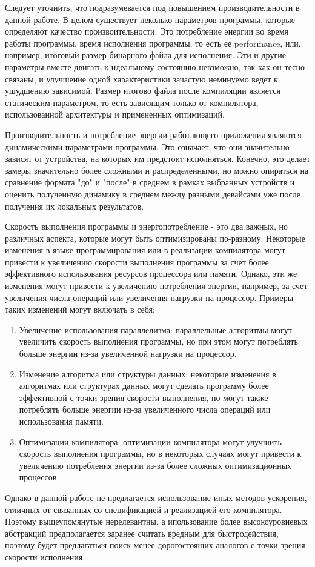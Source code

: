 \documentclass{mipt-thesis-bs}
\begin{document}
Следует уточнить, что подразумевается под повышением производительности в данной работе.
В целом существует неколько параметров программы, которые определяют качество произвоительности.
Это потребление энергии во время работы программы, время исполнения программы, то есть ее performance, или,
например, итоговый размер бинарного файла для исполнения.
Эти и другие параметры вместе двигать к идеальному состоянию невзможно, так как он тесно связаны, и
улучшение одной характеристики зачастую неминуемо ведет к ушудшению зависимой.
Размер итогово файла после компиляции является статическим параметром, то есть зависящим
только от компилятора, использованной архитектуры и примененных оптимизаций.

Производительность и потребление энергии работающего приложения являются динамическими
параметрами программы. Это означает, что они значительно зависят от устройства, на которых
им предстоит исполняться. Конечно, это делает замеры значительно более сложными и распределенными,
но можно опираться на сравнение формата "до" и "после" в среднем в рамках выбранных устройств и
оценить полученную динамику в среднем между разными девайсами уже после получения их локальных результатов.

Скорость выполнения программы и энергопотребление - это два важных, но различных аспекта,
которые могут быть оптимизированы по-разному. Некоторые изменения в языке программирования
или в реализации компилятора могут привести к увеличению скорости выполнения программы за
счет более эффективного использования ресурсов процессора или памяти. Однако, эти же изменения
могут привести к увеличению потребления энергии, например, за счет увеличения числа операций
или увеличения нагрузки на процессор. Примеры таких изменений могут включать в себя:
\begin{enumerate}
    \item Увеличение использования параллелизма: параллельные алгоритмы могут увеличить
    скорость выполнения программы, но при этом могут потреблять больше энергии из-за
    увеличенной нагрузки на процессор.
    \item Изменение алгоритма или структуры данных: некоторые изменения в алгоритмах
    или структурах данных могут сделать программу более эффективной с точки зрения
    скорости выполнения, но могут также потреблять больше энергии из-за увеличенного
    числа операций или использования памяти.
    \item Оптимизации компилятора: оптимизации компилятора могут улучшить скорость
    выполнения программы, но в некоторых случаях могут привести к увеличению потребления
    энергии из-за более сложных оптимизационных процессов.
\end{enumerate}
Однако в данной работе не предлагается использование иных методов ускорения, отличных от связанных со
спецификацией и реализацией его компилятора. Поэтому вышеупомянутые нерелевантны, а ипользование более
высокоуровневых абстракций предполагается заранее считать вредным для быстродействия, поэтому
будет предлагаться поиск менее дорогостоящих аналогов с точки зрения скорости исполнения.
\end{document}
